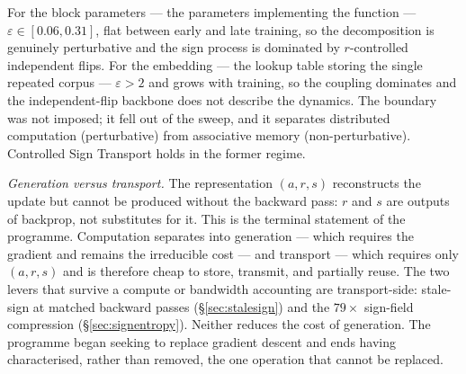 For the block parameters --- the parameters implementing the function ---
$\varepsilon \in [0.06, 0.31]$, flat between early and late training, so the
decomposition is genuinely perturbative and the sign process is dominated by
$r$-controlled independent flips. For the embedding --- the lookup table storing
the single repeated corpus --- $\varepsilon > 2$ and grows with training, so the
coupling dominates and the independent-flip backbone does not describe the
dynamics. The boundary was not imposed; it fell out of the sweep, and it
separates distributed computation (perturbative) from associative memory
(non-perturbative). Controlled Sign Transport holds in the former regime.

\emph{Generation versus transport.} The representation $(a,r,s)$ reconstructs the
update but cannot be produced without the backward pass: $r$ and $s$ are outputs
of backprop, not substitutes for it. This is the terminal statement of the
programme. Computation separates into generation --- which requires the
gradient and remains the irreducible cost --- and transport --- which requires
only $(a,r,s)$ and is therefore cheap to store, transmit, and partially reuse.
The two levers that survive a compute or bandwidth accounting are transport-side:
stale-sign at matched backward passes (\S\ref{sec:stalesign}) and the $79\times$
sign-field compression (\S\ref{sec:signentropy}). Neither reduces the cost of
generation. The programme began seeking to replace gradient descent and ends
having characterised, rather than removed, the one operation that cannot be
replaced.

